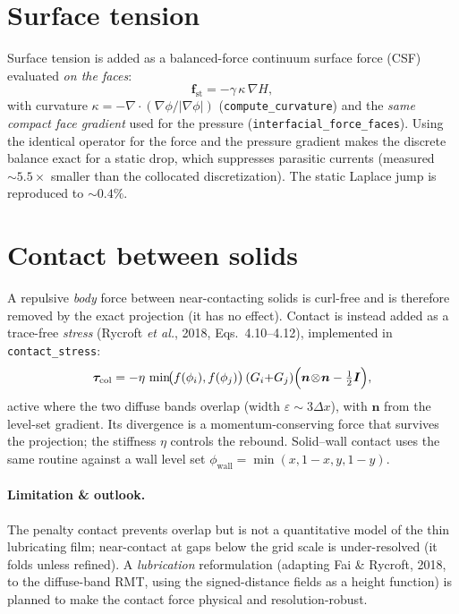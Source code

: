 \documentclass[11pt]{article}
\newcommand{\grad}{\nabla}
\begin{document}
\section{Surface tension}
Surface tension is added as a balanced-force continuum surface force (CSF) evaluated
\emph{on the faces}:
\begin{equation}
\bm f_{\text{st}} = -\gamma\,\kappa\,\grad H ,
\end{equation}
with curvature $\kappa=-\grad\!\cdot\!(\grad\phi/|\grad\phi|)$
(\texttt{compute\_curvature}) and the \emph{same compact face gradient} used for the
pressure (\texttt{interfacial\_force\_faces}). Using the identical operator for the
force and the pressure gradient makes the discrete balance exact for a static drop,
which suppresses parasitic currents (measured $\sim\!5.5\times$ smaller than the
collocated discretization). The static Laplace jump is reproduced to $\sim\!0.4\%$.

\section{Contact between solids}
A repulsive \emph{body} force between near-contacting solids is curl-free and is
therefore removed by the exact projection (it has no effect). Contact is instead
added as a trace-free \emph{stress} (Rycroft \emph{et al.}, 2018,
Eqs.~4.10--4.12), implemented in \texttt{contact\_stress}:
\begin{equation}
\bm\tau_{\text{col}} = -\eta\,\min\!\bigl(f(\phi_i),f(\phi_j)\bigr)\,(G_i{+}G_j)
\Bigl(\bm n\!\otimes\!\bm n-\tfrac12\bm I\Bigr),
\end{equation}
active where the two diffuse bands overlap (width $\varepsilon\sim 3\Delta x$), with
$\bm n$ from the level-set gradient. Its divergence is a momentum-conserving force
that survives the projection; the stiffness $\eta$ controls the rebound.
Solid--wall contact uses the same routine against a wall level set
$\phi_{\text{wall}}=\min(x,1{-}x,y,1{-}y)$.
\paragraph{Limitation \& outlook.} The penalty contact prevents overlap but is not a
quantitative model of the thin lubricating film; near-contact at gaps below the grid
scale is under-resolved (it folds unless refined). A \emph{lubrication} reformulation
(adapting Fai \& Rycroft, 2018, to the diffuse-band RMT, using the signed-distance
fields as a height function) is planned to make the contact force physical and
resolution-robust.
\end{document}
